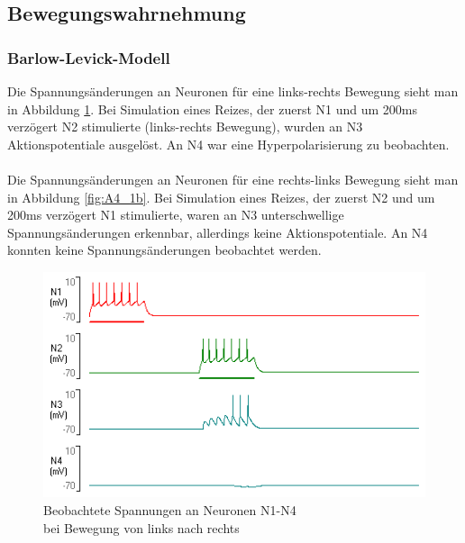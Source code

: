\documentclass[a4paper]{article}
\begin{document}
\newpage
\subsection{Bewegungswahrnehmung}
\subsubsection{Barlow-Levick-Modell}

\noindent Die Spannungsänderungen an Neuronen für eine links-rechts Bewegung sieht man in Abbildung \ref{fig:A4_1a}.
Bei Simulation eines Reizes, der zuerst N1 und um 200ms verzögert N2 stimulierte (links-rechts Bewegung), wurden an N3 Aktionspotentiale ausgelöst. An N4 war eine Hyperpolarisierung zu beobachten. \\ \\
Die Spannungsänderungen an Neuronen für eine rechts-links Bewegung sieht man in Abbildung \ref{fig:A4_1b}. Bei Simulation eines Reizes, der zuerst N2 und um 200ms verzögert N1 stimulierte, waren an N3 unterschwellige Spannungsänderungen erkennbar, allerdings keine Aktionspotentiale. An N4 konnten  keine Spannungsänderungen beobachtet werden. 
\\
\begin{figure}[H]
    \centering
    \includegraphics[scale=0.7]{images/Aufgabe4_1_linksRechts.png}
    \caption{Beobachtete Spannungen an Neuronen N1-N4 \\ bei Bewegung von links nach rechts}
    \label{fig:A4_1a}
\end{figure}

\vspace{2.0\baselineskip}
\end{document}
